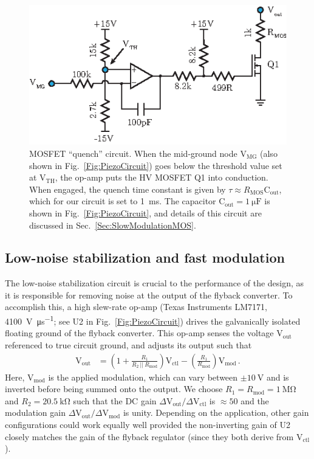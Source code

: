 \documentclass[aip,rsi,reprint]{revtex4-1} %
\begin{document}
\begin{figure}[t!]
\includegraphics[width=\columnwidth]{MOS}
\caption{MOSFET ``quench'' circuit.
When the mid-ground node $\text{V}_\text{MG}$ (also shown in Fig.~\ref{Fig:PiezoCircuit}) goes below the threshold value set at $\text{V}_\text{TH}$, the op-amp puts the HV MOSFET Q1 into conduction.
When engaged, the quench time constant is given by $\tau \approx R_\text{MOS} \text{C}_\text{out}$, which for our circuit is set to \SI{1}{\milli\second}. The capacitor $\text{C}_\text{out}=\SI{1}{\micro\farad}$ is shown in Fig.~\ref{Fig:PiezoCircuit}, and details of this circuit are discussed in Sec.~\ref{Sec:SlowModulationMOS}.
\label{Fig:MOS}}
\end{figure}


\subsection{Low-noise stabilization and fast modulation}
\label{Sec:LowNoiseStabilization}

The low-noise stabilization circuit is crucial to the performance of the design, as it is responsible for removing noise at the output of the flyback converter.
To accomplish this, a high slew-rate op-amp (Texas Instruments LM7171, \SI[per-mode=symbol]{4100}{\volt\per\micro\second}; see U2 in Fig.~\ref{Fig:PiezoCircuit}) drives the galvanically isolated floating ground of the flyback converter.
This op-amp senses the voltage $\text{V}_\text{out}$ referenced to true circuit ground, and adjusts its output such that
\begin{align}
\text{V}_\text{out} &= \left(1 + \frac{R_1}{R_2~||~R_\text{mod}}\right) \text{V}_\text{ctl} -
\left(\frac{R_1}{R_\text{mod}}\right) \text{V}_\text{mod}\,.
\label{Eq:FullTransferFunc}
\end{align}
Here, $\text{V}_\text{mod}$ is the applied modulation, which can vary between $\pm\SI{10}{\volt}$ and is inverted before being summed onto the output.
We choose $R_1 = R_\text{mod} = \SI{1}{\mega\ohm}$ and $R_2 = \SI{20.5}{\kilo\ohm}$ such that the DC gain $\Delta\text{V}_\text{out}/\Delta\text{V}_\text{ctl}$ is $\approx 50$ and the modulation gain $\Delta\text{V}_\text{out}/\Delta\text{V}_\text{mod}$ is unity.
Depending on the application, other gain configurations could work equally well provided the non-inverting gain of U2 closely matches the gain of the flyback regulator (since they both derive from $\text{V}_\text{ctl}$).
\end{document}
